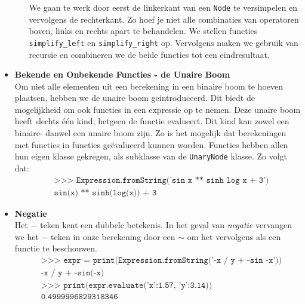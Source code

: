 \documentclass[12pt]{article}
\begin{document}
\begin{itemize}
\begin{itemize}
We gaan te werk door eerst de linkerkant van een \texttt{Node} te versimpelen en vervolgens de rechterkant. Zo hoef je niet alle combinaties van operatoren boven, links en rechts apart te behandelen. We stellen functies \texttt{simplify\_left} en \texttt{simplify\_right} op. Vervolgens maken we gebruik van recursie en combineren we de beide functies tot een eindresultaat. 
\end{itemize}
\newpage
\item \textbf{Bekende en Onbekende Functies - de Unaire Boom} \\
Om niet alle elementen uit een berekening in een binaire boom te hoeven plaatsen, hebben we de unaire boom geintroduceerd. Dit biedt de mogelijkheid om ook functies in een expressie op te nemen. Deze unaire boom heeft slechts \'e\'en kind, hetgeen de functie evalueert. Dit kind kan zowel een binaire- danwel een unaire boom zijn. Zo is het mogelijk dat berekeningen met functies in functies ge\"evalueerd kunnen worden. Functies hebben allen hun eigen klasse gekregen, als subklasse van de \texttt{UnaryNode} klasse. Zo volgt dat:
\begin{align*}
&\texttt{>>> Expression.fromString('sin x ** sinh log x + 3')}\\
&\texttt{sin(x) ** sinh(log(x)) + 3}
\end{align*}

\item \textbf{Negatie} \\
Het $-$ teken kent een dubbele betekenis. In het geval van \textit{negatie} vervangen we het $-$ teken in onze berekening door een $\sim$ om het vervolgens als een functie te beschouwen. 
\begin{align*}
&\texttt{>>> expr =  print(Expression.fromString('-x / y + -sin -x'))}\\
&\texttt{-x / y + -sin(-x)}\\
&\texttt{>>> print(expr.evaluate({'x':1.57, 'y':3.14}))}\\
&\texttt{0.4999996829318346}
\end{align*}
\end{itemize}
\vspace{1pc}
\end{document}
